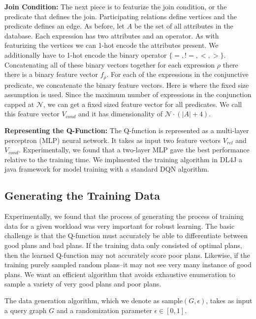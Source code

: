 \vspace{0.5em} \noindent \textbf{Join Condition: } The next piece is to featurize the join condition, or the predicate that defines the join. Participating relations define vertices and the predicate defines an edge. As before, let $A$ be the set of all attributes in the database. Each expression has two attributes and an operator. As with featurizing the vertices we can 1-hot encode the attributes present. We additionally have to 1-hot encode the binary operator $\{=,!=,<,>\}$. Concatenating all of these binary vectors together for each expression $\rho$ there there is a binary feature vector $f_\rho$.  For each of the expressions in the conjunctive predicate, we concatenate the binary feature vectors. Here is where the fixed size assumption is used. Since the maximum number of expressions in the conjunction capped at $\mathcal{N}$, we can get a fixed sized feature vector for all predicates. We call this feature vector $V_{cond}$ and it has dimensionality of $\mathcal{N} \cdot(|A|+4)$. 

\vspace{0.5em} \noindent \textbf{Representing the Q-Function: }
The Q-function is represented as a multi-layer perceptron (MLP) neural network.
It takes as input two feature vectors $V_{rel}$ and $V_{cond}$. Experimentally, we found that a two-layer MLP gave the best performance relative to the training time. We implmented the training algorithm in \textsf{DL4J} a java framework for model training with a standard DQN algorithm.

\subsection*{Generating the Training Data}
Experimentally, we found that the process of generating the process of training data for a given workload was very important for robust learning.
The basic challenge is that the Q-function must accurately be able to differentiate between good plans and bad plans.
If the training data only consisted of optimal plans, then the learned Q-function may not accurately score poor plans. Likewise, if the training purely sampled random plans--it may not see very many instance of good plans.
We want an efficient algorithm that avoids exhaustive enumeration to sample a variety of very good plans and poor plans.

The data generation algorithm, which we denote as \textsf{sample}$(G, \epsilon)$, takes as input a query graph $G$ and a randomization parameter $\epsilon \in [0,1]$.

